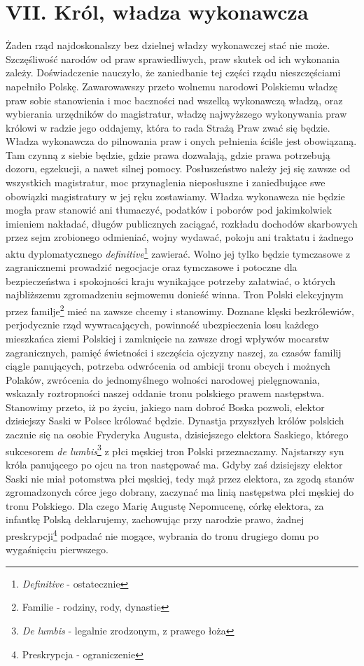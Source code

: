\documentclass{book}
\begin{document}
 
\section*{VII. Król, władza wykonawcza}

 Żaden rząd najdoskonalszy bez dzielnej władzy wykonawczej stać nie może. Szczęśliwość narodów od praw sprawiedliwych, praw skutek od ich wykonania zależy. Doświadczenie nauczyło, że zaniedbanie tej części rządu nieszczęściami napełniło Polskę. Zawarowawszy przeto wolnemu narodowi Polskiemu władzę praw sobie stanowienia i moc baczności nad wszelką wykonawczą władzą, oraz wybierania urzędników do magistratur, władzę najwyższego wykonywania praw królowi w radzie jego oddajemy, która to rada Strażą Praw zwać się będzie. Władza wykonawcza do pilnowania praw i onych pełnienia ściśle jest obowiązaną. Tam czynną z siebie będzie, gdzie prawa dozwalają, gdzie prawa potrzebują dozoru, egzekucji, a nawet silnej pomocy.  Posłuszeństwo należy jej się zawsze od wszystkich magistratur, moc przynaglenia nieposłuszne i zaniedbujące swe obowiązki magistratury w jej ręku zostawiamy.  Władza wykonawcza nie będzie mogła praw stanowić ani tłumaczyć, podatków i poborów pod jakimkolwiek imieniem nakładać, długów publicznych zaciągać, rozkładu dochodów skarbowych przez sejm zrobionego odmieniać,  wojny wydawać, pokoju ani traktatu  i żadnego aktu dyplomatycznego \textit{definitive}\footnote{\textit{Definitive} - ostatecznie} zawierać. Wolno jej tylko będzie tymczasowe z zagranicznemi prowadzić negocjacje oraz tymczasowe i potoczne dla bezpieczeństwa i spokojności kraju wynikające potrzeby załatwiać,  o których najbliższemu zgromadzeniu sejmowemu donieść winna.  Tron Polski elekcyjnym przez familje\footnote{Familie - rodziny, rody, dynastie} mieć na zawsze chcemy i stanowimy.  Doznane klęski bezkrólewiów, perjodycznie rząd wywracających, powinność ubezpieczenia losu każdego mieszkańca ziemi Polskiej i zamknięcie na zawsze drogi wpływów mocarstw zagranicznych, pamięć świetności i szczęścia ojczyzny naszej, za czasów familij ciągle panujących, potrzeba odwrócenia od ambicji tronu obcych i możnych Polaków,  zwrócenia do jednomyślnego wolności narodowej pielęgnowania, wskazały roztropności naszej oddanie tronu polskiego prawem następstwa.  Stanowimy przeto, iż po życiu, jakiego nam dobroć Boska pozwoli, elektor dzisiejszy Saski w Polsce królować będzie.  Dynastja przyszłych królów polskich zacznie się na osobie Fryderyka Augusta, dzisiejszego elektora Saskiego, którego sukcesorem \textit{de lumbis}\footnote{\textit{De lumbis} - legalnie zrodzonym, z prawego łoża} z płci męskiej tron Polski przeznaczamy. Najstarszy syn króla panującego po ojcu na tron następować ma.  Gdyby zaś dzisiejszy elektor Saski nie miał potomstwa płci męskiej, tedy mąż przez elektora, za zgodą stanów zgromadzonych córce jego dobrany, zaczynać ma linią następstwa płci męskiej do tronu Polskiego.  Dla czego Marię Augustę Nepomucenę, córkę elektora, za infantkę Polską deklarujemy, zachowując przy narodzie prawo, żadnej preskrypcji\footnote{Preskrypcja - ograniczenie} podpadać nie mogące, wybrania do tronu drugiego domu po wygaśnięciu pierwszego. 
\end{document}
